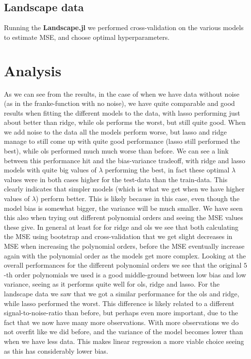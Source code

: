 \documentclass{article}
\begin{document}
\subsection{Landscape data}
Running the \textbf{Landscape.jl} we performed cross-validation on the various
models to estimate MSE, and choose optimal hyperparameters.

\section{Analysis}
As we can see from the results, in the case of when we have data without noise
(as in the franke-function with no noise), we have quite comparable and good
results when fitting the different models to the data, with lasso performing
just about better than ridge, while ols performs the worst, but still quite
good. When we add noise to the data all the models perform worse, but lasso and
ridge manage to still come up with quite good performance (lasso still performed
the best), while ols performed much much worse than before. We can see a link
between this performance hit and the bias-variance tradeoff, with ridge and
lasso models with quite big values of $\lambda$ performing the best, in fact
these optimal $\lambda$ values were in both cases higher for the test-data than
the train-data. This clearly indicates that simpler models (which is what we get
when we have higher values of $\lambda$) perform better. This is likely because
in this case, even though the model bias is somewhat bigger, the variance will
be much smaller. We have seen this also when trying out different polynomial
orders and seeing the MSE values these give. In general at least for for ridge
and ols we see that both calculating the MSE using bootstrap and
cross-validation that we get slight decreases in MSE when increasing the
polynomial orders, before the MSE eventually increase again with the polynomial
order as the models get more complex. Looking at the overall performances for
the different polynomial orders we see that the original $5$-th order
polynomials we used is a good middle-ground between low bias and low variance,
seeing as it performs quite well for ols, ridge and lasso. For the landscape
data we saw that we got a similar performance for the ols and ridge, while lasso
performed the worst. This difference is likely related to a different
signal-to-noise-ratio than before, but perhaps even more important, due to the
fact that we now have many more observations. With more observations we do not
overfit like we did before, and the variance of the model becomes lower than
when we have less data. This makes linear regression a more viable choice seeing
as this has considerably lower bias.
\end{document}
